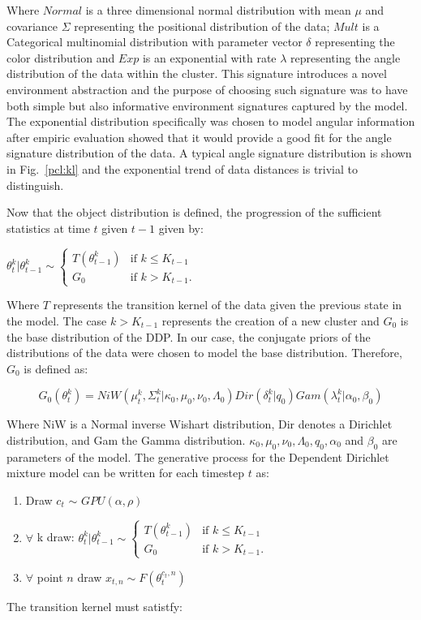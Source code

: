 \documentclass[twoside,hidelinks]{article}
\begin{document}
Where $Normal$ is a three dimensional normal distribution with mean $\mu$ and covariance $\Sigma$ representing the positional distribution of the data; $Mult$ is a Categorical multinomial distribution with parameter vector $\delta$ representing the color distribution and $Exp$ is an exponential with rate $\lambda$ representing the angle distribution of the data within the cluster. This signature introduces a novel environment abstraction and the purpose of choosing such signature was to have both simple but also informative environment signatures captured by the model. The exponential distribution specifically  was chosen to model angular information after empiric evaluation showed that it would provide a good fit for the angle signature distribution of the data. A typical angle signature distribution is shown in Fig.~\ref{pcl:kl} and the exponential trend of data distances is trivial to distinguish.

Now that the object distribution is defined, the progression of the sufficient statistics at time $t$ given $t-1$ given by:


\begin{center}
 $\theta_t^k | \theta_{t-1}^k \sim
\begin{cases} T (\theta_{t-1}^k) &\mbox{if } k \leq K_{t-1} \\
G_0 & \mbox{if } k > K_{t-1}. \end{cases}$
\end{center}

Where $T$ represents the transition kernel of the data given the previous state in the model. The case $ k > K_{t-1} $ represents the creation of a new cluster and $G_0$ is the base distribution of the DDP. In our case, the conjugate priors of the distributions of the data were chosen to model the base distribution. Therefore, $G_0$ is defined as:

$$ G_0(\theta_t^k)  = NiW( \mu_t^k, \Sigma_t^k | \kappa_0, \mu_0, \nu_0, \Lambda_0 ) Dir(\delta_t^k | q_0) Gam( \lambda_t^k | \alpha_0, \beta_0) $$

Where NiW is a Normal inverse Wishart distribution, Dir denotes a Dirichlet distribution, and Gam the Gamma distribution. $ \kappa_0, \mu_0, \nu_0, \Lambda_0, q_0,\alpha_0$ and $\beta_0$ are parameters of the model. The generative process for the Dependent Dirichlet mixture model can be written for each timestep $t$ as:

\noindent\makebox[\linewidth]{\rule{\textwidth}{0.4pt}}
\begin{enumerate}
	\item Draw  $c_t$ $\sim$ $GPU(\alpha, \rho) $
	\item $\forall$  k draw: $ \theta_t^k | \theta_{t-1}^k \sim
	\begin{cases} T (\theta_{t-1}^k) &\mbox{if } k \leq K_{t-1} \\
	G_0 & \mbox{if } k > K_{t-1}. \end{cases}$
	\item $\forall$  point $n$ draw $ x_{t,n} \sim F(\theta_t^{c_t,n})$
\end{enumerate}
\noindent\makebox[\linewidth]{\rule{\textwidth}{0.4pt}}
The transition kernel must satistfy\cite{caron}:
\end{document}
